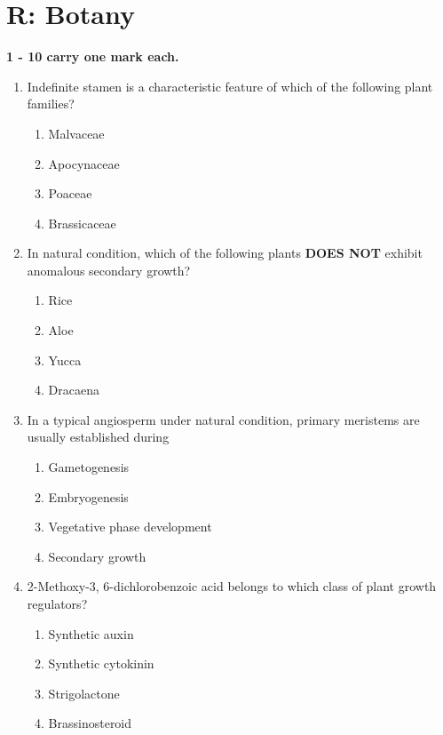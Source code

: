 \documentclass[journal,12pt,onecolumn]{IEEEtran}
\begin{document}
\section*{\centering  R: Botany}
\noindent \textbf{1 - 10 carry one mark each.}
\begin{enumerate}[label=\arabic*.]
\item Indefinite stamen is a characteristic feature of which of the following plant families?
\begin{multicols}{2}
\begin{enumerate}[label=(\Alph*)]
    \item Malvaceae
    \item Apocynaceae
    \item Poaceae
    \item Brassicaceae
\end{enumerate}
\end{multicols}

\item In natural condition, which of the following plants \textbf{DOES NOT} exhibit anomalous secondary growth?
\begin{multicols}{2}
\begin{enumerate}[label=(\Alph*)]
    \item Rice
    \item Aloe
    \item Yucca
    \item Dracaena
\end{enumerate}
\end{multicols}

\item In a typical angiosperm under natural condition, primary meristems are usually established during
\begin{multicols}{2}
\begin{enumerate}[label=(\Alph*)]
    \item Gametogenesis
    \item Embryogenesis
    \item Vegetative phase development
    \item Secondary growth
\end{enumerate}
\end{multicols}

\item 2-Methoxy-3, 6-dichlorobenzoic acid belongs to which class of plant growth regulators?
\begin{multicols}{2}
\begin{enumerate}[label=(\Alph*)]
    \item Synthetic auxin
    \item Synthetic cytokinin
    \item Strigolactone
    \item Brassinosteroid
\end{enumerate}
\end{multicols}


\end{enumerate}
\end{document}
